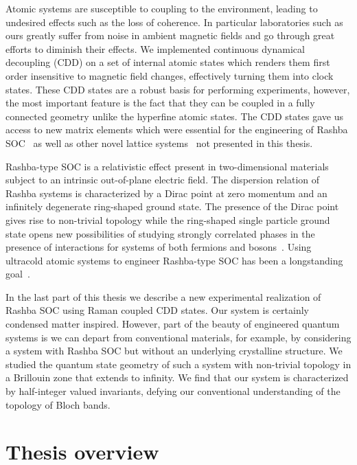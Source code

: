 Atomic systems are susceptible to coupling to the environment, leading to undesired effects such as the loss of coherence. In particular laboratories such as ours greatly suffer from noise in ambient magnetic fields and go through great efforts to diminish their effects. We implemented continuous dynamical decoupling (CDD) on a set of internal atomic states which renders them first order insensitive to magnetic field changes, effectively turning them into clock states. These CDD states are a robust basis for performing experiments, however, the most important feature is the fact that they can be coupled in a fully connected geometry unlike the hyperfine atomic states. The CDD states gave us access to new matrix elements which were essential for the engineering of Rashba SOC~\cite{valdes-curiel_unconventional_2019} as well as other novel lattice systems~\cite{anderson_realization_2019} not presented in this thesis. 

Rashba-type SOC is a relativistic effect present in two-dimensional materials subject to an intrinsic out-of-plane electric field. The dispersion relation of Rashba systems is characterized by a Dirac point at zero momentum and an infinitely degenerate ring-shaped ground state. The presence of the Dirac point gives rise to non-trivial topology while the ring-shaped single particle ground state opens new possibilities of studying strongly correlated phases in the presence of interactions for systems of both fermions and bosons~\cite{stanescu_spin-orbit_2008,sedrakyan_composite_2012,hu_probing_2011}. Using ultracold atomic systems to engineer Rashba-type SOC has been a longstanding goal~\cite{galitski_spin-orbit_2013}. 

In the last part of this thesis we describe a new experimental realization of Rashba SOC using Raman coupled CDD states. Our system is certainly condensed matter inspired. However, part of the beauty of engineered quantum systems is we can depart from conventional materials, for example, by considering a system with Rashba SOC but without an underlying crystalline structure. We studied the quantum state geometry of such a system with non-trivial topology in a Brillouin zone that extends to infinity. We find that our system is characterized by half-integer valued invariants, defying our conventional understanding of the topology of Bloch bands. 

\section{Thesis overview}

